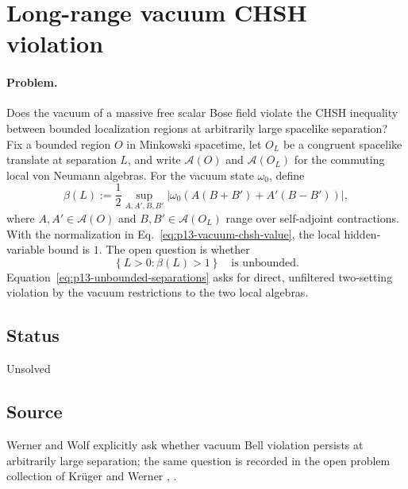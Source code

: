 \section{Long-range vacuum CHSH violation}
\label{sec:op_660dbca2258b1a9b}

\paragraph{Problem.}
Does the vacuum of a massive free scalar Bose field violate the CHSH
inequality between bounded localization regions at arbitrarily large spacelike
separation?  Fix a bounded region $O$ in Minkowski spacetime, let $O_L$ be a
congruent spacelike translate at separation $L$, and write $\mathcal{A}(O)$ and
$\mathcal{A}(O_L)$ for the commuting local von Neumann algebras.  For the
vacuum state $\omega_0$, define
\begin{equation}
  \beta(L)
  :=\frac12\sup_{A,A',B,B'}
  \left|
    \omega_0\!\left(A(B+B')+A'(B-B')\right)
  \right|,
  \label{eq:p13-vacuum-chsh-value}
\end{equation}
where $A,A'\in\mathcal{A}(O)$ and $B,B'\in\mathcal{A}(O_L)$ range over
self-adjoint contractions.  With the normalization in
Eq.~\eqref{eq:p13-vacuum-chsh-value}, the local hidden-variable bound is $1$.
The open question is whether
\begin{equation}
  \left\{L>0:\beta(L)>1\right\}
  \quad\text{is unbounded}.
  \label{eq:p13-unbounded-separations}
\end{equation}
Equation~\eqref{eq:p13-unbounded-separations} asks for direct, unfiltered
two-setting violation by the vacuum restrictions to the two local algebras.

\subsection*{Status}

Unsolved

\subsection*{Source}

Werner and Wolf explicitly ask whether vacuum Bell violation persists at
arbitrarily large separation; the same question is recorded in the open
problem collection of Kr\"uger and Werner
,
.

